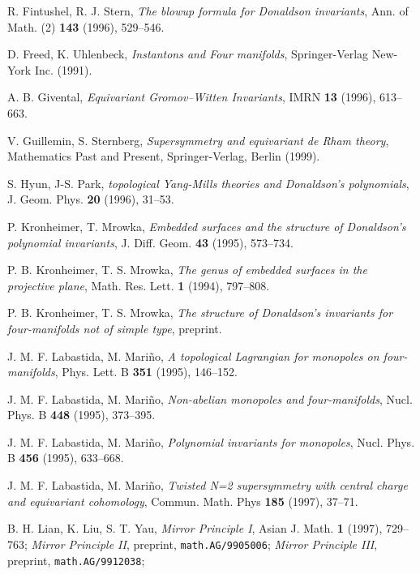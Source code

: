 \documentclass[a4paper,12pt,reqno,sumlimits]{amsart}
\theoremstyle{plain}
\theoremstyle{definition}
\providecommand{\1}{{\bf 1}}
\numberwithin{equation}{section}
\begin{document}
\begin{thebibliography}{999}
 R. Fintushel, R. J. Stern, {\em The blowup formula for Donaldson invariants},
  Ann. of Math. (2) {\bf 143} (1996), 529--546.

 D. Freed, K. Uhlenbeck, {\em Instantons and Four manifolds},
  Springer-Verlag New-York Inc. (1991).
  
 A. B. Givental, {\em Equivariant Gromov--Witten
    Invariants}, IMRN {\bf 13} (1996), 613--663.
  
 V. Guillemin, S. Sternberg, {\em Supersymmetry and
    equivariant de Rham theory}, Mathematics Past and Present,
  Springer-Verlag, Berlin (1999).
  
 S. Hyun, J-S. Park, {\em {}\coordHE{} topological Yang-Mills theories
    and Donaldson's polynomials}, J. Geom. Phys. {\bf 20} (1996), 31--53.
  
 P. Kronheimer, T. Mrowka, {\em Embedded surfaces and the
    structure of Donaldson's polynomial invariants}, J. Diff. Geom. {\bf 43}
  (1995), 573--734.
  
 P. B. Kronheimer, T. S. Mrowka, {\em The genus of embedded
    surfaces in the projective plane}, Math. Res. Lett. {\bf 1} (1994),
  797--808.
  
 P. B. Kronheimer, T. S. Mrowka, {\em The structure of
    Donaldson's invariants for four-manifolds not of simple type}, preprint.
  
 J. M. F. Labastida, M. Mari\~no, {\em A topological
    Lagrangian for monopoles on four-manifolds}, Phys. Lett. B {\bf 351}
  (1995), 146--152.
  
 J. M. F. Labastida, M. Mari\~no, {\em Non-abelian
    monopoles and four-manifolds}, Nucl. Phys. B {\bf 448} (1995),
  373--395.
  
 J. M. F. Labastida, M. Mari\~no, {\em Polynomial
    invariants for \coordHE{} monopoles}, Nucl. Phys. B {\bf 456} (1995),
  633--668.
  
 J. M. F. Labastida, M. Mari\~no, {\em Twisted N=2
    supersymmetry with central charge and equivariant cohomology}, Commun.
  Math. Phys {\bf 185} (1997), 37--71.
  
 B. H. Lian, K. Liu, S. T. Yau, {\em Mirror Principle I},
  Asian J. Math. {\bf 1} (1997), 729--763; {\em Mirror Principle II},
  preprint, \texttt{math.AG/9905006}; {\em Mirror Principle III}, preprint,
  \texttt{math.AG/9912038};
  

\end{thebibliography}
\end{document}
